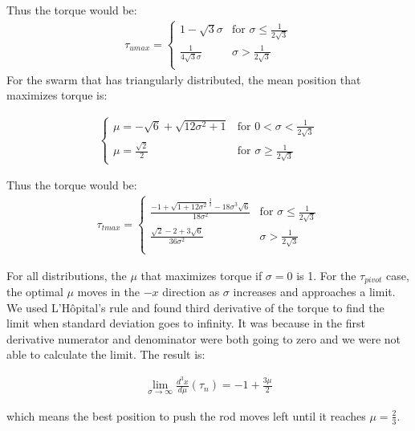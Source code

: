 Thus the torque would be:
\begin{align}
\tau_{umax} =\left\{
\begin{array}{ll}
1-\sqrt{3}\sigma &   \textrm{for     } \sigma \leq \frac{1}{2\sqrt{3}}\\
\frac{1}{4 \sqrt{3}\sigma} &   \sigma > \frac{1}{2\sqrt{3}}\\
\end{array} 
\right.
\end{align}
For the swarm that has triangularly distributed, the mean position that maximizes torque is:

\begin{align}
\left\{
\begin{array}{ll}
\mu = -\sqrt{6} + \sqrt{12\sigma^2 +1} &   \textrm{for     } 0< \sigma  <\frac{1}{2\sqrt{3}} \\
\mu = \frac{\sqrt{2}}{2} &   \textrm{for     } \sigma \geq \frac{1}{2\sqrt{3}} 
\end{array} 
\right.
\end{align}

Thus the torque would be:
\begin{align}
\tau_{tmax} =\left\{
\begin{array}{ll}
\frac{-1 + \sqrt{1+12\sigma^2}^{\frac{3}{2}}- 18\sigma^3\sqrt{6}}{18\sigma^2} &   \textrm{for     } \sigma \leq \frac{1}{2\sqrt{3}}\\
\frac{\sqrt{2}-2+3\sqrt{6}}{36\sigma^2} &   \sigma > \frac{1}{2\sqrt{3}}\\
\end{array} 
\right.
\end{align}


For all distributions, the $\mu$ that maximizes torque if $\sigma = 0$ is 1. For the $\tau_{pivot}$ case, the optimal $\mu$ moves in the $-x$ direction as $\sigma$ increases and approaches a limit. We used L'H\^opital's rule and found third derivative of the torque to find the limit when standard deviation goes to infinity. It was because in the first derivative numerator and denominator were both going to zero and we were not able to calculate the limit. The result is:

\begin{align}
\lim_{\sigma\to\infty} \frac{d^3x}{d\mu}(\tau_n)= -1+\frac{3\mu}{2}
\end{align}

which means the best position to push the rod moves left until it reaches $\mu = \frac{2}{3}$.




